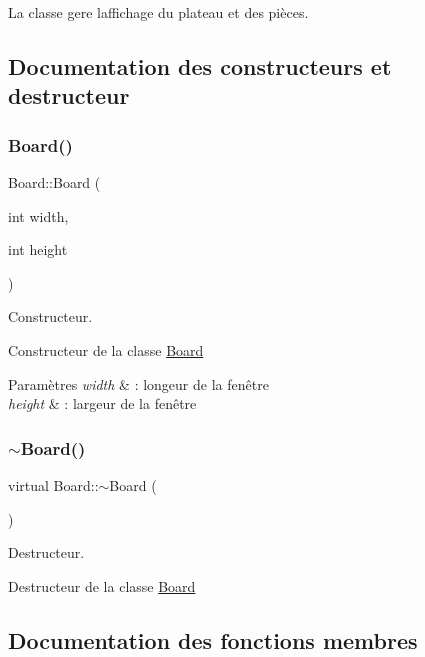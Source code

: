 La classe gere l\textquotesingle{}affichage du plateau et des pièces. 

\subsection{Documentation des constructeurs et destructeur}
\mbox{\label{class_board_aaa5fa080b8caf42a9a8309e4fc45a045}} 
\subsubsection{\texorpdfstring{Board()}{Board()}}
{\footnotesize\ttfamily Board\+::\+Board (\begin{DoxyParamCaption}\item[{int}]{width,  }\item[{int}]{height }\end{DoxyParamCaption})}



Constructeur. 

Constructeur de la classe \hyperlink{class_board}{Board}


\begin{DoxyParams}{Paramètres}
{\em width} & \+: longeur de la fenêtre \\
\hline
{\em height} & \+: largeur de la fenêtre \\
\hline
\end{DoxyParams}
\mbox{\label{class_board_a2fba9e5428840eb48645c078b9f0dcce}} 
\subsubsection{\texorpdfstring{$\sim$\+Board()}{~Board()}}
{\footnotesize\ttfamily virtual Board\+::$\sim$\+Board (\begin{DoxyParamCaption}{ }\end{DoxyParamCaption})}



Destructeur. 

Destructeur de la classe \hyperlink{class_board}{Board} 

\subsection{Documentation des fonctions membres}
\mbox{\label{class_board_a2d04e2638eb72204e89a2aab9991a949}} 
